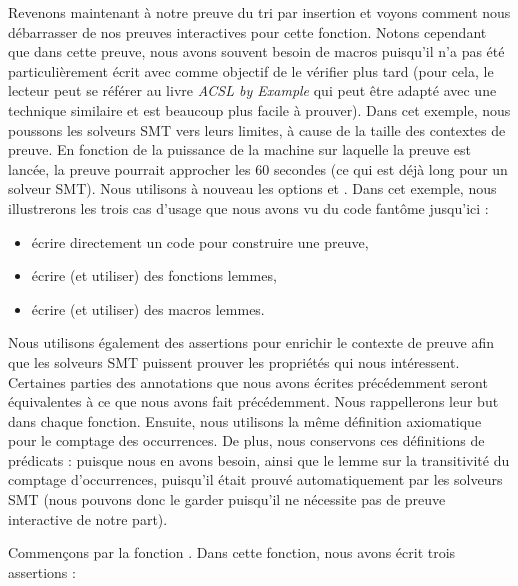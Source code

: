

Revenons maintenant à notre preuve du tri par insertion et voyons comment
nous débarrasser de nos preuves interactives pour cette fonction. Notons
cependant que dans cette preuve, nous avons souvent besoin de macros puisqu'il
n'a pas été particulièrement écrit avec comme objectif de le vérifier plus tard
(pour cela, le lecteur peut se référer au livre \textit{ACSL by Example} qui peut être
adapté avec une technique similaire et est beaucoup plus facile à prouver).
Dans cet exemple, nous poussons les solveurs SMT vers leurs limites, à cause de
la taille des contextes de preuve. En fonction de la puissance de la machine sur laquelle
la preuve est lancée, la preuve pourrait approcher les 60 secondes (ce qui est
déjà long pour un solveur SMT). Nous utilisons à nouveau les options
 et .
Dans cet exemple, nous illustrerons les trois
cas d'usage que nous avons vu du code fantôme jusqu'ici :
\begin{itemize}
    \item écrire directement un code pour construire une preuve,
    \item écrire (et utiliser) des fonctions lemmes,
    \item écrire (et utiliser) des macros lemmes.
\end{itemize}


Nous utilisons également des assertions pour enrichir le contexte de preuve
afin que les solveurs SMT puissent prouver les propriétés qui nous intéressent.
Certaines parties des annotations que nous avons écrites précédemment seront
équivalentes à ce que nous avons fait précédemment. Nous rappellerons leur
but dans chaque fonction. Ensuite, nous utilisons la même définition axiomatique
pour le comptage des occurrences. De plus, nous conservons ces définitions de
prédicats :
puisque nous en avons besoin, ainsi que le lemme sur la transitivité du
comptage d'occurrences, puisqu'il était prouvé automatiquement par les solveurs
SMT (nous pouvons donc le garder puisqu'il ne nécessite pas de preuve interactive
de notre part).




Commençons par la fonction . Dans cette fonction,
nous avons écrit trois assertions :




